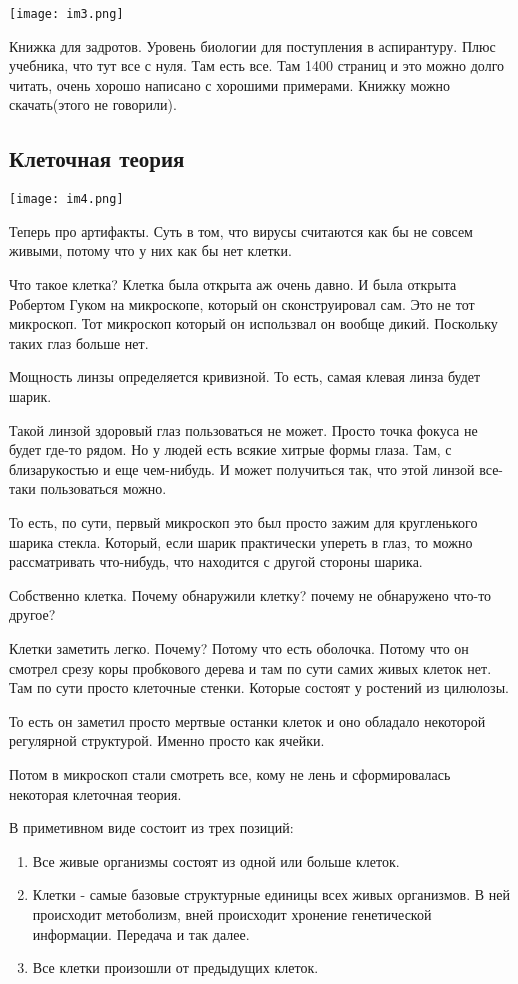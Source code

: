 \texttt{[image: im3.png]}

Книжка для задротов. Уровень биологии для поступления в аспирантуру.
Плюс учебника, что тут все с нуля. Там есть все. Там 1400 страниц
и это можно долго читать, очень хорошо написано с хорошими примерами.
Книжку можно скачать(этого не говорили).   

\subsection{Клеточная теория}

\texttt{[image: im4.png]}

Теперь про артифакты. Суть в том, что вирусы считаются 
как бы не совсем живыми, потому что у них как бы нет 
клетки. 

Что такое клетка?
Клетка была открыта аж очень давно. И была открыта Робертом
Гуком на микроскопе, который он сконструировал сам. Это не тот
микроскоп. Тот микроскоп который он использвал он вообще дикий.
Поскольку таких глаз больше нет.

Мощность линзы определяется кривизной. То есть,
самая клевая линза будет шарик. 

Такой линзой здоровый глаз пользоваться не может.
Просто точка фокуса не будет где-то рядом. Но
у людей есть всякие хитрые формы глаза. Там, с
близарукостью и еще чем-нибудь. И может получиться
так, что этой линзой все-таки пользоваться можно.

То есть, по сути, первый микроскоп это был
просто зажим для кругленького шарика стекла.
Который, если шарик практически упереть в глаз,
то можно рассматривать что-нибудь, что находится
с другой стороны шарика.

Собственно клетка. Почему обнаружили клетку?
почему не обнаружено что-то другое?

Клетки заметить легко. Почему? Потому что есть
оболочка. Потому что он смотрел срезу
коры пробкового дерева и там по сути самих живых
клеток нет. Там по сути просто
клеточные стенки. Которые состоят у ростений из цилюлозы.

То есть он заметил просто мертвые останки клеток и
оно обладало некоторой регулярной структурой. Именно просто как
ячейки.

Потом в микроскоп стали смотреть все, кому не лень и
сформировалась некоторая клеточная теория.

В приметивном виде состоит из трех позиций:
\begin{enumerate}
\item 
Все живые организмы состоят из одной или больше клеток. 
\item 
Клетки - самые базовые структурные единицы всех живых организмов. 
В ней происходит метоболизм, вней происходит хронение генетической 
информации. Передача и так далее. 
\item 
Все клетки произошли от предыдущих клеток. 
\end{enumerate} 

